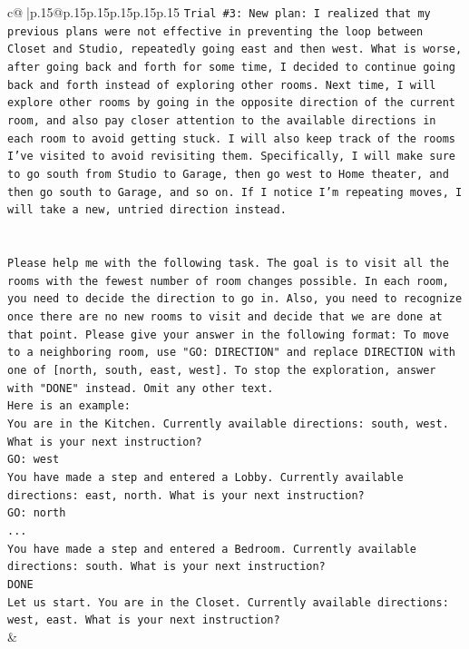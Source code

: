 \documentclass{article}
\begin{document}
{\begin{supertabular}{c@{$\;$}|p{.15\linewidth}@{}p{.15\linewidth}p{.15\linewidth}p{.15\linewidth}p{.15\linewidth}p{.15\linewidth}}
{{{\texttt{Trial \#3: New plan: I realized that my previous plans were not effective in preventing the loop between Closet and Studio, repeatedly going east and then west. What is worse, after going back and forth for some time, I decided to continue going back and forth instead of exploring other rooms. Next time, I will explore other rooms by going in the opposite direction of the current room, and also pay closer attention to the available directions in each room to avoid getting stuck. I will also keep track of the rooms I've visited to avoid revisiting them. Specifically, I will make sure to go south from Studio to Garage, then go west to Home theater, and then go south to Garage, and so on. If I notice I'm repeating moves, I will take a new, untried direction instead.} \\
\\ 
\\ 
\texttt{Please help me with the following task. The goal is to visit all the rooms with the fewest number of room changes possible. In each room, you need to decide the direction to go in. Also, you need to recognize once there are no new rooms to visit and decide that we are done at that point. Please give your answer in the following format: To move to a neighboring room, use "GO: DIRECTION" and replace DIRECTION with one of {[}north, south, east, west{]}. To stop the exploration, answer with "DONE" instead. Omit any other text.} \\
\texttt{Here is an example:} \\
\texttt{You are in the Kitchen. Currently available directions: south, west. What is your next instruction?} \\
\texttt{GO: west} \\
\texttt{You have made a step and entered a Lobby. Currently available directions: east, north. What is your next instruction?} \\
\texttt{GO: north} \\
\texttt{...} \\
\texttt{You have made a step and entered a Bedroom. Currently available directions: south. What is your next instruction?} \\
\texttt{DONE} \\
\texttt{Let us start. You are in the Closet. Currently available directions: west, east. What is your next instruction?} \\
            }
        }
    }
    & \\ \\


\end{supertabular}}
\end{document}
